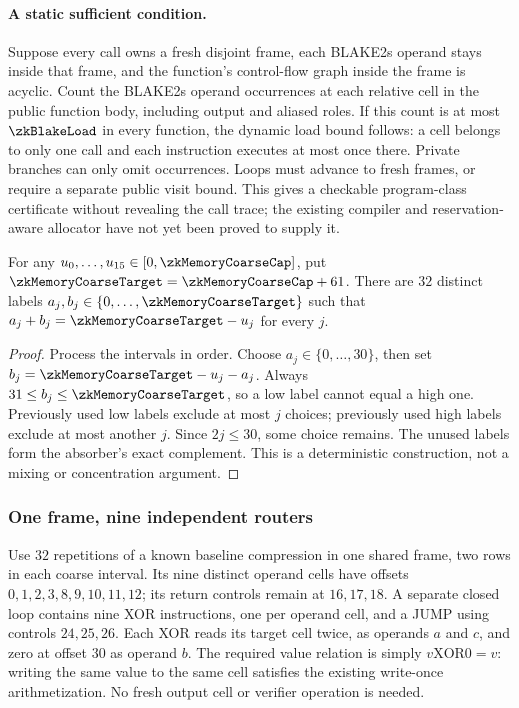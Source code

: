 \paragraph{A static sufficient condition.} Suppose every call owns a fresh disjoint frame, each BLAKE2s operand stays inside that frame, and the function's control-flow graph inside the frame is acyclic. Count the BLAKE2s operand occurrences at each relative cell in the public function body, including output and aliased roles. If this count is at most $\zkBlakeLoad$ in every function, the dynamic load bound follows: a cell belongs to only one call and each instruction executes at most once there. Private branches can only omit occurrences. Loops must advance to fresh frames, or require a separate public visit bound. This gives a checkable program-class certificate without revealing the call trace; the existing compiler and reservation-aware allocator have not yet been proved to supply it.

\begin{lemma}\label{lem:zk-two-label-router}
For any $u_0,\ldots,u_{15}\in[0,\zkMemoryCoarseCap]$, put $\zkMemoryCoarseTarget=\zkMemoryCoarseCap+61$. There are $32$ distinct labels $a_j,b_j\in\{0,\ldots,\zkMemoryCoarseTarget\}$ such that $a_j+b_j=\zkMemoryCoarseTarget-u_j$ for every $j$.
\end{lemma}
\begin{proof}
Process the intervals in order. Choose $a_j\in\{0,\ldots,30\}$, then set $b_j=\zkMemoryCoarseTarget-u_j-a_j$. Always $31\le b_j\le\zkMemoryCoarseTarget$, so a low label cannot equal a high one. Previously used low labels exclude at most $j$ choices; previously used high labels exclude at most another $j$. Since $2j\le30$, some choice remains. The unused labels form the absorber's exact complement. This is a deterministic construction, not a mixing or concentration argument.
\end{proof}

\subsubsection{One frame, nine independent routers}

Use $32$ repetitions of a known baseline compression in one shared frame, two rows in each coarse interval. Its nine distinct operand cells have offsets $0,1,2,3,8,9,10,11,12$; its return controls remain at $16,17,18$. A separate closed loop contains nine XOR instructions, one per operand cell, and a JUMP using controls $24,25,26$. Each XOR reads its target cell twice, as operands $a$ and $c$, and zero at offset $30$ as operand $b$. The required value relation is simply $v\mathbin{\mathrm{XOR}}0=v$: writing the same value to the same cell satisfies the existing write-once arithmetization. No fresh output cell or verifier operation is needed.

